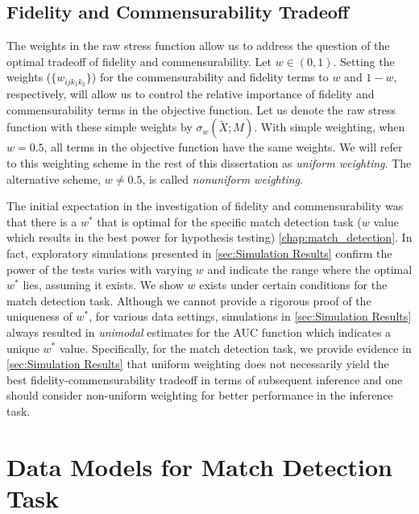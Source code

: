 \documentclass[12pt,oneside,final]{thesis}\usepackage[]{graphicx}\usepackage[]{color}
\begin{document}
\section{Fidelity and Commensurability Tradeoff \label{sec:FidCommTradeoff}}
 The weights in the raw stress function allow us to address the question of the optimal tradeoff of  fidelity and commensurability. Let $w \in (0,1)$. Setting the weights ($\{w_{ijk_1k_2}\}$)  for the commensurability  and fidelity  terms    to $w$ and $1-w$, respectively,  will allow us to control the relative importance of fidelity and commensurability terms in the objective function. Let us denote the raw stress function with these simple weights by $\sigma_w(\widetilde{X};M)$.  With simple weighting, when $w=0.5$, all terms in the objective function have the same weights. We will refer to this weighting scheme in the rest of this dissertation as \emph{uniform weighting}. The alternative scheme, $w \neq 0.5$, is called \emph{nonuniform weighting}.
 
 
The initial  expectation in the investigation of fidelity and commensurability was that there is a $w^*$ that is optimal for the specific match detection task ($w$ value which results in the best power for hypothesis testing) \ref{chap:match_detection}. In fact,  exploratory simulations presented in \ref{sec:Simulation Results}  confirm the power of the tests varies with varying $w$ and indicate the range where the optimal  $w^*$ lies, assuming it exists. We show $w$ exists under certain conditions for the match detection task. Although we cannot provide  a rigorous proof of the uniqueness of $w^*$, for various data settings, simulations in \autoref{sec:Simulation Results} always resulted in \emph{unimodal}  estimates for the AUC function which indicates a unique $w^*$ value.
Specifically,  for the match detection task, we provide evidence in \ref{sec:Simulation Results} that  uniform weighting does not necessarily yield the best fidelity-commensurability tradeoff in terms of subsequent inference and one should consider non-uniform weighting for better performance in the inference task\cite{JOFC_Tradeoff}.



\chapter{Data Models for Match Detection Task}
\label{chap:data_models}
\end{document}
